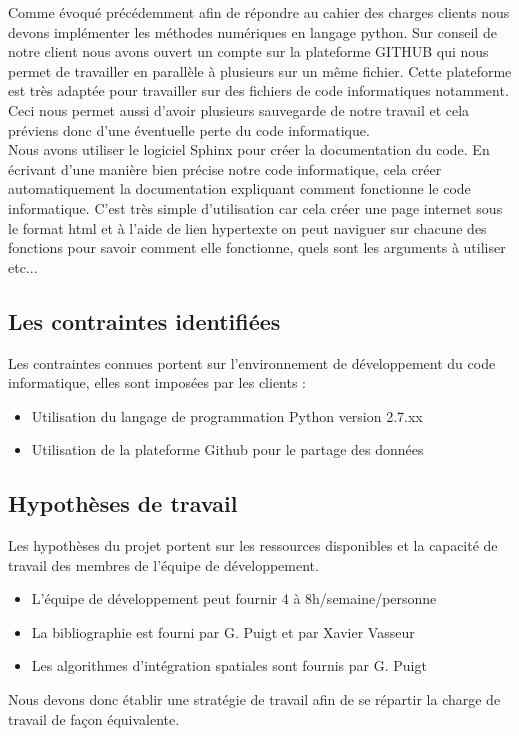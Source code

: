 \documentclass[a4paper,12pt]{report}
\theoremstyle{break}
\begin{document}
Comme évoqué précédemment afin de répondre au cahier des charges clients nous devons implémenter les méthodes numériques en langage python. Sur conseil de notre client nous avons ouvert un compte sur la plateforme GITHUB qui nous permet de travailler en parallèle à plusieurs sur un même fichier. Cette plateforme est très adaptée pour travailler sur des fichiers de code informatiques notamment. Ceci nous permet aussi d'avoir plusieurs sauvegarde de notre travail et cela préviens donc d'une éventuelle perte du code informatique. \\ 

Nous avons utiliser le logiciel Sphinx pour créer la documentation du code. En écrivant d'une manière bien précise notre code informatique, cela créer automatiquement la documentation expliquant comment fonctionne le code informatique. C'est très simple d'utilisation car cela créer une page internet sous le format html et à l'aide de lien hypertexte on peut naviguer sur chacune des fonctions pour savoir comment elle fonctionne, quels sont les arguments à utiliser etc...


\subsection{Les contraintes identifiées}
    Les contraintes connues portent sur l’environnement de développement du code informatique, elles sont imposées par les clients :
   \begin{itemize}[label=\textbullet]
   	\item Utilisation du langage de programmation Python version 2.7.xx
   	\item Utilisation de la plateforme Github pour le partage des données
    \end{itemize}

\subsection{Hypothèses de travail}
    Les hypothèses du projet portent sur les ressources disponibles et la capacité de travail des membres de l’équipe de développement.
   \begin{itemize}[label=\textbullet]
   	\item L’équipe de développement peut fournir 4 à 8h/semaine/personne
   	\item La bibliographie est fourni par G. Puigt et par Xavier Vasseur
   	\item  Les algorithmes d’intégration spatiales sont fournis par G. Puigt
    \end{itemize}
\vspace{3mm}
Nous devons donc établir une stratégie de travail afin de se répartir la charge de travail de façon équivalente. 
\end{document}
